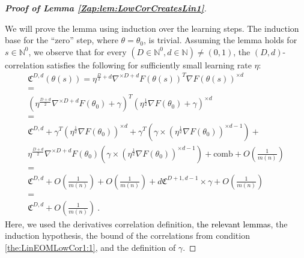 \documentclass{article} %
\begin{document}
\begin{proof}[\textbf{Proof of Lemma \ref{Zap:lem:LowCorCreatesLin1}}]
\

We will prove the lemma using induction over the learning steps. The induction base for the ``zero'' step, where \(\theta=\theta_0\), is trivial. Assuming the lemma holds for \(s\in\mathbb{N}^0\), we observe that for every \(\left(D\in\mathbb{N}^{0},d\in\mathbb{N}\right)\neq\left(0,1\right)\), the \((D,d)\)-correlation satisfies the following for sufficiently small learning rate \(\eta\):
\begin{equation}
\begin{array}{c}
\mathfrak{C}^{D,d}\left(\theta\left(s\right)\right)=\eta^{\frac{D}{2}+d}\nabla^{\times D+d}F\left(\theta\left(s\right)\right)^{T}\nabla F\left(\theta\left(s\right)\right)^{\times d}\\
=\\
\left(\eta^{\frac{D+d}{2}}\nabla^{\times D+d}F\left(\theta_{0}\right)+\gamma\right)^{T}\left(\eta^{\frac{1}{2}}\nabla F\left(\theta_{0}\right)+\gamma\right)^{\times d}\\
=\\
\mathfrak{C}^{D,d}+\gamma^{T}\left(\eta^{\frac{1}{2}}\nabla F\left(\theta_{0}\right)\right)^{\times d}+\gamma^{T}\left(\gamma\times\left(\eta^{\frac{1}{2}}\nabla F\left(\theta_{0}\right)\right)^{\times d-1}\right)+\\
\eta^{\frac{D+d}{2}}\nabla^{\times D+d}F\left(\theta_{0}\right)\left(\gamma\times\left(\eta^{\frac{1}{2}}\nabla F\left(\theta_{0}\right)\right)^{\times d-1}\right)+\text{comb}+O\left(\frac{1}{m\left(n\right)}\right)\\
=\\
\mathfrak{C}^{D,d}+O\left(\frac{1}{m\left(n\right)}\right)+O\left(\frac{1}{m\left(n\right)}\right)+d\mathfrak{C}^{D+1,d-1}\times\gamma+O\left(\frac{1}{m\left(n\right)}\right)\\
=\\
\mathfrak{C}^{D,d}+O\left(\frac{1}{m\left(n\right)}\right) \ .
\end{array}
\end{equation}
Here, we used the derivatives correlation definition, \textcolor{black}{the relevant lemmas}, the induction hypothesis, the bound of the correlations from condition \ref{the:LinEOMLowCor1:1}, and the definition of \(\gamma\).


\end{proof}
\end{document}
